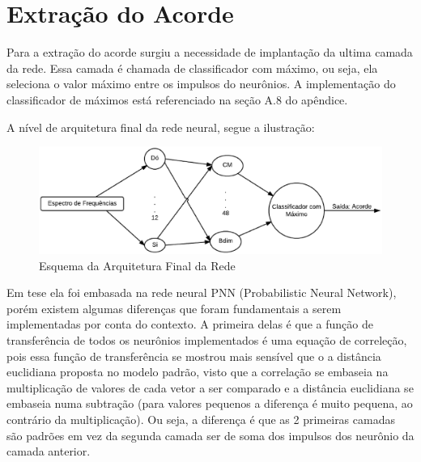 \section{Extração do Acorde}
\label{sec:extracaoacorde}

Para a extração do acorde surgiu a necessidade de implantação da ultima camada da rede. Essa camada é chamada de classificador com máximo, ou seja, ela seleciona o valor máximo entre os impulsos do neurônios. A implementação do classificador de máximos está referenciado na seção A.8 do apêndice.

A nível de arquitetura final da rede neural, segue a ilustração:

\begin{figure}[h]
	\centering
		\includegraphics[keepaspectratio=true,scale=0.45]{figuras/rede_total}
	\caption{Esquema da Arquitetura Final da Rede}
\end{figure}

Em tese ela foi embasada na rede neural PNN (Probabilistic Neural Network), porém existem algumas diferenças que foram fundamentais a serem implementadas por conta do contexto. A primeira delas é que a função de transferência de todos os neurônios implementados é uma equação de correleção, pois essa função de transferência se mostrou mais sensível que o a distância euclidiana proposta no modelo padrão, visto que a correlação se embaseia na multiplicação de valores de cada vetor a ser comparado e a distância euclidiana se embaseia numa subtração (para valores pequenos a diferença é muito pequena, ao contrário da multiplicação). Ou seja, a diferença é que as 2 primeiras camadas são padrões em vez da segunda camada ser de soma dos impulsos dos neurônio da camada anterior.
